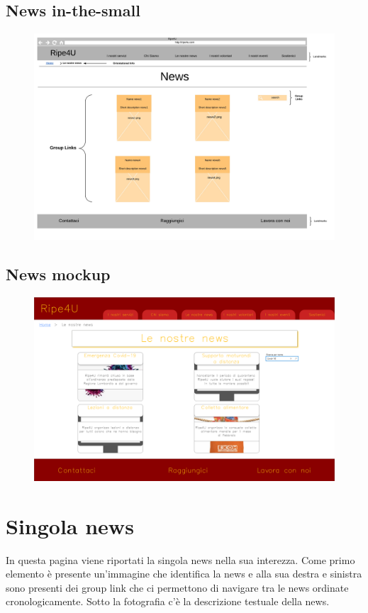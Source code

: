         \subsection{News in-the-small}
        \begin{figure}[H]
            \centering
            \includegraphics[scale=0.37]{resources/images/news-in-the-small.jpg}
        \end{figure}

        \subsection{News mockup}
        \begin{figure}[H]
            \centering
            \includegraphics[scale=0.18]{resources/images/news-mockup.png}
        \end{figure}
    
    \newpage    
    \section{Singola news}
    In questa pagina viene riportati la singola news nella sua interezza. Come
    primo elemento è presente un'immagine che identifica la news e alla sua
    destra e sinistra sono presenti dei group link che ci permettono di navigare
    tra le news ordinate cronologicamente. Sotto la fotografia c'è la
    descrizione testuale della news.

